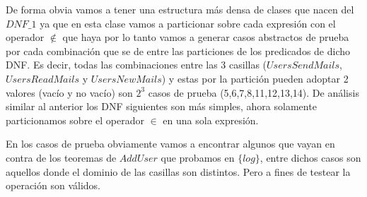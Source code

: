 De forma obvia vamos a tener una estructura más densa de clases que nacen del $DNF\_1$ ya que en esta clase vamos a particionar sobre cada expresión con el operador $\notin$ que haya por lo tanto vamos a generar casos abstractos de prueba por cada combinación que se de entre las particiones de los predicados de dicho DNF. Es decir, todas las combinaciones entre las 3 casillas ($UsersSendMails$, $UsersReadMails$ y $UsersNewMails$) y estas por la partición pueden adoptar 2 valores (vacío y no vacío) son $2^3$ casos de prueba (5,6,7,8,11,12,13,14).
De análisis similar al anterior los DNF siguientes son más simples, ahora solamente particionamos sobre el operador $\in$ en una sola expresión.

En los casos de prueba obviamente vamos a encontrar algunos que vayan en contra de los teoremas de $AddUser$ que probamos en $\{log\}$, entre dichos casos son aquellos donde el dominio de las casillas son distintos. Pero a fines de testear la operación son válidos.